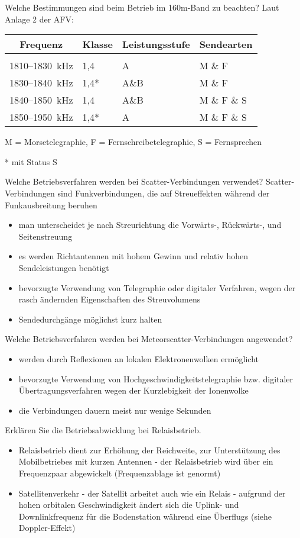 \documentclass[avery5371,grid,frame,a4paper]{flashcards}
\newcommand{\card}[3]{
  \begin{flashcard}[{\chap} -- #1]{#2}#3\end{flashcard}
}
\begin{document}
\card{56}{Welche Bestimmungen sind beim Betrieb im 160m-Band zu beachten?}{
  Laut Anlage 2 der AFV:

  \footnotesize
  \vspace{10pt}
  \begin{tabular}{clll}
    Frequenz & Klasse & Leistungsstufe & Sendearten \\
  \hline \\
    1810--1830~kHz & 1,4  & A    & M \& F \\
    1830--1840~kHz & 1,4* & A\&B & M \& F \\
    1840--1850~kHz & 1,4  & A\&B & M \& F \& S \\
    1850--1950~kHz & 1,4* & A    & M \& F \& S \\
  \end{tabular}
  \vspace{10pt}

  M = Morsetelegraphie, F = Fernschreibetelegraphie, S = Fernsprechen

  * \quad mit Status S
}
\card{57}{Welche Betriebsverfahren werden bei Scatter-Verbindungen verwendet?}{
  \small
  Scatter-Verbindungen sind Funkverbindungen, die auf Streueffekten während der Funkausbreitung beruhen
  \begin{itemize}
    \item man unterscheidet je nach Streurichtung die Vorwärts-, Rückwärts-, und Seitenstreuung
    \item es werden Richtantennen mit hohem Gewinn und relativ hohen Sendeleistungen benötigt
    \item bevorzugte Verwendung von Telegraphie oder digitaler Verfahren, wegen der rasch ändernden Eigenschaften des Streuvolumens
    \item Sendedurchgänge möglichst kurz halten
  \end{itemize}
}
\card{58}{Welche Betriebsverfahren werden bei Meteorscatter-Verbindungen angewendet?}{
  \begin{itemize}
    \item werden durch Reflexionen an lokalen Elektronenwolken ermöglicht
    \item bevorzugte Verwendung von Hochgeschwindigkeitstelegraphie bzw. digitaler Übertragungsverfahren wegen der Kurzlebigkeit der Ionenwolke
    \item die Verbindungen dauern meist nur wenige Sekunden
  \end{itemize}
}
\card{59}{Erklären Sie die Betriebsabwicklung bei Relaisbetrieb.}{
  \begin{itemize}
    \item Relaisbetrieb dient zur Erhöhung der Reichweite, zur Unterstützung des Mobilbetriebes mit kurzen Antennen - der Relaisbetrieb wird über ein Frequenzpaar abgewickelt (Frequenzablage ist genormt)

    \item Satellitenverkehr - der Satellit arbeitet auch wie ein Relais - aufgrund der hohen orbitalen Geschwindigkeit ändert sich die Uplink- und Downlinkfrequenz für die Bodenstation während eine Überflugs (siehe Doppler-Effekt)
  \end{itemize}
}
\end{document}
